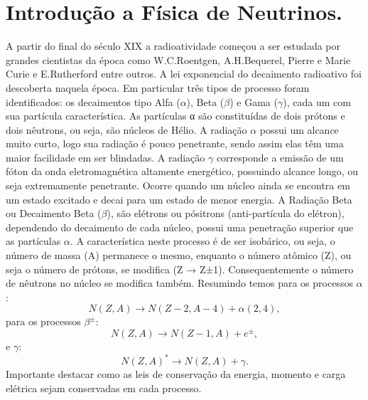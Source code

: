 \chapter{Introdução a Física de Neutrinos.}
A partir do final do século XIX a radioatividade começou a ser estudada por grandes cientistas da época como W.C.Roentgen, A.H.Bequerel, Pierre e Marie Curie e E.Rutherford entre outros.
A lei exponencial do decaimento radioativo foi descoberta naquela época.
Em particular três tipos de processo foram identificados: os decaimentos tipo Alfa ($\alpha$), Beta ($\beta$) e Gama ($\gamma$), cada um com sua partícula característica. 
As partículas α são constituídas de dois prótons e dois nêutrons, ou seja, são núcleos de Hélio. 
A radiação $\alpha$ possui um alcance muito curto, logo sua radiação é pouco penetrante, sendo assim elas têm uma maior facilidade em ser blindadas.
A radiação $\gamma$ corresponde a emissão de um fóton da onda eletromagnética altamente energético, possuindo alcance longo, ou seja extremamente penetrante. 
Ocorre quando um núcleo ainda se encontra em um estado excitado e decai para um estado de menor energia.
A Radiação Beta ou Decaimento Beta ($\beta$), são elétrons ou pósitrons (anti-partícula do elétron), dependendo do decaimento de cada núcleo, possui uma penetração superior que as partículas $\alpha$. 
A característica neste processo é de ser isobárico, ou seja, o número de massa (A) permanece o mesmo, enquanto o número atômico (Z), ou seja o número de prótons, se modifica (Z → Z±1).
Consequentemente o número de nêutrons no núcleo se modifica também.
Resumindo temos para os processos $\alpha$:
\begin{equation}
    N(Z,A) \rightarrow N(Z-2,A-4)+\alpha(2,4),
\end{equation}
para os processos $\beta^\pm$:
\begin{equation}
    N(Z,A) \rightarrow N(Z-1,A)+e^{\pm},
\end{equation}
e $\gamma$:
\begin{equation}
    N(Z,A)^* \rightarrow N(Z,A)+\gamma.
\end{equation}
Importante destacar como as leis de conservação da energia, momento e carga elétrica sejam conservadas em cada processo.

